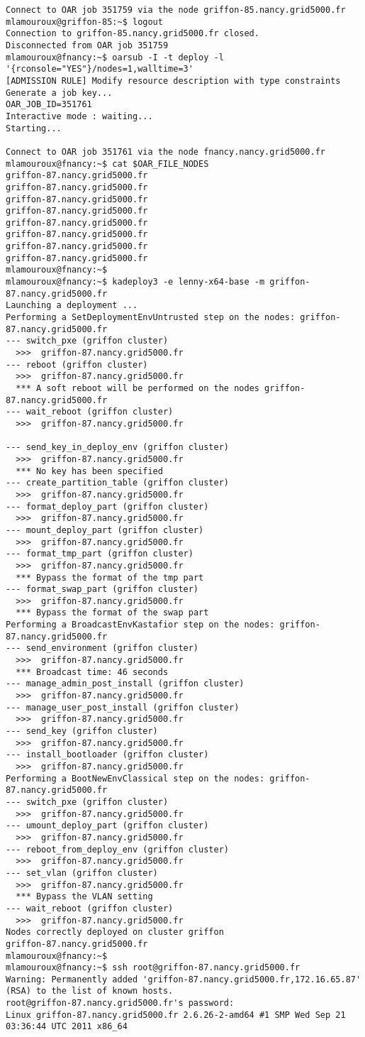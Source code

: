 \begin{lstlisting}
Connect to OAR job 351759 via the node griffon-85.nancy.grid5000.fr
mlamouroux@griffon-85:~$ logout
Connection to griffon-85.nancy.grid5000.fr closed.
Disconnected from OAR job 351759
mlamouroux@fnancy:~$ oarsub -I -t deploy -l '{rconsole="YES"}/nodes=1,walltime=3'
[ADMISSION RULE] Modify resource description with type constraints
Generate a job key...
OAR_JOB_ID=351761
Interactive mode : waiting...
Starting...

Connect to OAR job 351761 via the node fnancy.nancy.grid5000.fr
mlamouroux@fnancy:~$ cat $OAR_FILE_NODES
griffon-87.nancy.grid5000.fr
griffon-87.nancy.grid5000.fr
griffon-87.nancy.grid5000.fr
griffon-87.nancy.grid5000.fr
griffon-87.nancy.grid5000.fr
griffon-87.nancy.grid5000.fr
griffon-87.nancy.grid5000.fr
griffon-87.nancy.grid5000.fr
mlamouroux@fnancy:~$ 
mlamouroux@fnancy:~$ kadeploy3 -e lenny-x64-base -m griffon-87.nancy.grid5000.fr 
Launching a deployment ...
Performing a SetDeploymentEnvUntrusted step on the nodes: griffon-87.nancy.grid5000.fr
--- switch_pxe (griffon cluster)
  >>>  griffon-87.nancy.grid5000.fr
--- reboot (griffon cluster)
  >>>  griffon-87.nancy.grid5000.fr
  *** A soft reboot will be performed on the nodes griffon-87.nancy.grid5000.fr
--- wait_reboot (griffon cluster)
  >>>  griffon-87.nancy.grid5000.fr

--- send_key_in_deploy_env (griffon cluster)
  >>>  griffon-87.nancy.grid5000.fr
  *** No key has been specified
--- create_partition_table (griffon cluster)
  >>>  griffon-87.nancy.grid5000.fr
--- format_deploy_part (griffon cluster)
  >>>  griffon-87.nancy.grid5000.fr
--- mount_deploy_part (griffon cluster)
  >>>  griffon-87.nancy.grid5000.fr
--- format_tmp_part (griffon cluster)
  >>>  griffon-87.nancy.grid5000.fr
  *** Bypass the format of the tmp part
--- format_swap_part (griffon cluster)
  >>>  griffon-87.nancy.grid5000.fr
  *** Bypass the format of the swap part
Performing a BroadcastEnvKastafior step on the nodes: griffon-87.nancy.grid5000.fr
--- send_environment (griffon cluster)
  >>>  griffon-87.nancy.grid5000.fr
  *** Broadcast time: 46 seconds
--- manage_admin_post_install (griffon cluster)
  >>>  griffon-87.nancy.grid5000.fr
--- manage_user_post_install (griffon cluster)
  >>>  griffon-87.nancy.grid5000.fr
--- send_key (griffon cluster)
  >>>  griffon-87.nancy.grid5000.fr
--- install_bootloader (griffon cluster)
  >>>  griffon-87.nancy.grid5000.fr
Performing a BootNewEnvClassical step on the nodes: griffon-87.nancy.grid5000.fr
--- switch_pxe (griffon cluster)
  >>>  griffon-87.nancy.grid5000.fr
--- umount_deploy_part (griffon cluster)
  >>>  griffon-87.nancy.grid5000.fr
--- reboot_from_deploy_env (griffon cluster)
  >>>  griffon-87.nancy.grid5000.fr
--- set_vlan (griffon cluster)
  >>>  griffon-87.nancy.grid5000.fr
  *** Bypass the VLAN setting
--- wait_reboot (griffon cluster)
  >>>  griffon-87.nancy.grid5000.fr
Nodes correctly deployed on cluster griffon
griffon-87.nancy.grid5000.fr
mlamouroux@fnancy:~$ 
mlamouroux@fnancy:~$ ssh root@griffon-87.nancy.grid5000.fr
Warning: Permanently added 'griffon-87.nancy.grid5000.fr,172.16.65.87' (RSA) to the list of known hosts.
root@griffon-87.nancy.grid5000.fr's password: 
Linux griffon-87.nancy.grid5000.fr 2.6.26-2-amd64 #1 SMP Wed Sep 21 03:36:44 UTC 2011 x86_64


\end{lstlisting}
